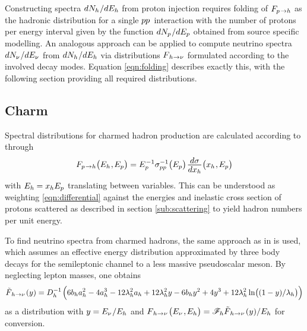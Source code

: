 Constructing spectra $dN_h \kern+0.5pt / dE_h$ from proton injection requires folding of $F_{p \kern+0.8pt \rightarrow h}$ as
the hadronic distribution for a single $p \kern-0.1pt p \kern+0.9pt$ interaction with the number of protons per energy interval
given by the function $dN_p \kern+0.6pt / dE_p$ obtained from source specific modelling. An analogous approach can be applied to
compute neutrino spectra $dN_\nu \kern+0.6pt / dE_\nu$ from $dN_h \kern+0.5pt / dE_h$ via distributions
$F_{\kern+1.0pt h \kern+0.2pt \rightarrow \nu}$ formulated according to the involved decay modes. Equation \eqref{eqn:folding}
describes exactly this, with the following section providing all required distributions.



\subsection{Charm}
\label{sub:charm}

Spectral distributions for charmed hadron production are calculated according to \cite{Carpio_2020} through
\begin{equation*}
	F_{p \kern+0.8pt \rightarrow h} \bigl( E_h \kern+0.5pt , \kern-0.5pt E_p \bigr) =
	E_p^{\kern+0.5pt -1} \sigma_{p \kern-0.1pt p}^{-1} \bigl( E_p \bigr) \kern+1.0pt
	\frac{\raisebox{-0.5ex}{$d\sigma$}}{\raisebox{0.5ex}{$dx_h$}} \bigl( x_h \kern+0.5pt, \kern-0.5pt E_p \bigr)
\end{equation*}
with $E_h \kern-0.2pt = x_h E_p$ translating between variables. This can be understood as weighting \eqref{eqn:differential}
against the energies and inelastic cross section of protons scattered as described in section \ref{sub:scattering} to yield hadron
numbers per unit energy.

To find neutrino spectra from charmed hadrons, the same approach as in \cite{Bhattacharya_2016} is used, which assumes an effective
energy distribution approximated by three body decays for the semileptonic channel to a less massive pseudoscalar meson.
By neglecting lepton masses, one obtains
\begin{equation*}
	\tilde{F}_{\kern+1.0pt h \kern+0.2pt \rightarrow \nu \kern+1.0pt} (y) = D_h^{-1} \kern+1.0pt \Bigl( 6b_ha_h^2 - 4a_h^3
	- 12\lambda_h^2 a_h + 12\lambda_h^2 y - 6b_h y^2 + 4 y^3 + 12 \lambda_h^2 \ln \bigl((1 - y) / \lambda_h \bigr) \Bigr)
\end{equation*}
as a distribution with $y = E_\nu \kern+0.6pt / E_h$ and $F_{\kern+1.0pt h \kern+0.2pt \rightarrow \nu \kern+1.0pt}
\bigl( E_\nu \kern+1.0pt , \kern-0.5pt E_h \bigr) = \mathscr{F}_h \tilde{F}_{\kern+1.0pt h \kern+0.2pt \rightarrow \nu \kern+1.0pt}
(y) / E_h$ for conversion.

